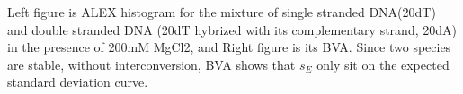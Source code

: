Left figure is ALEX histogram for the mixture of single stranded DNA(20dT) and double stranded DNA (20dT hybrized with its complementary strand, 20dA) in the presence of 200mM MgCl2, and Right figure is its BVA. Since two species are stable, without interconversion, BVA shows that $s_E$ only sit on the expected standard deviation curve.   